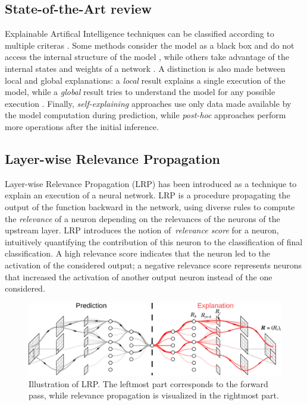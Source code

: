 \documentclass[twocolumn]{../cs-classes/cs-classes}
\newcommand*{\1}{\digitsbb{1}}
\newcommand*{\0}{\digitsbb{0}}
\begin{document}
\subsection{State-of-the-Art review}
Explainable Artifical Intelligence techniques can be classified according to multiple criteras \cite{xai-survey}. Some methods consider the model as a black box and do not access the internal structure of the model \cite{fong2017interpretable}, while others take advantage of the internal states and weights of a network \cite{bach-2015,gradcam,circuits,inverting}. A distinction is also made between local and global explanations: a \emph{local} result explains a single execution of the model, while a \emph{global} result tries to understand the model for any possible execution \cite{visualizing-cnn}. Finally, \emph{self-explaining} approaches use only data made available by the model computation during prediction, while \emph{post-hoc} approaches perform more operations after the initial inference.

\subsection{Layer-wise Relevance Propagation}
Layer-wise Relevance Propagation (LRP) \cite{bach-2015} has been introduced as a technique to explain an execution of a neural network. LRP is a procedure propagating the output of the function backward in the network, using diverse rules to compute the \emph{relevance} of a neuron depending on the relevances of the neurons of the upstream layer. LRP introduces the notion of \emph{relevance score} for a neuron, intuitively quantifying the contribution of this neuron to the classification of final classification. A high relevance score indicates that the neuron led to the activation of the considered output; a negative relevance score represents neurons that increased the activation of another output neuron instead of the one considered.

\begin{figure}[H]
    \centering
    \includegraphics[width=\linewidth]{LRP.png}
    \caption{Illustration of LRP. The leftmost part corresponds to the forward pass, while relevance propagation is visualized in the rightmost part.\protect\footnotemark}
\end{figure}
\end{document}
